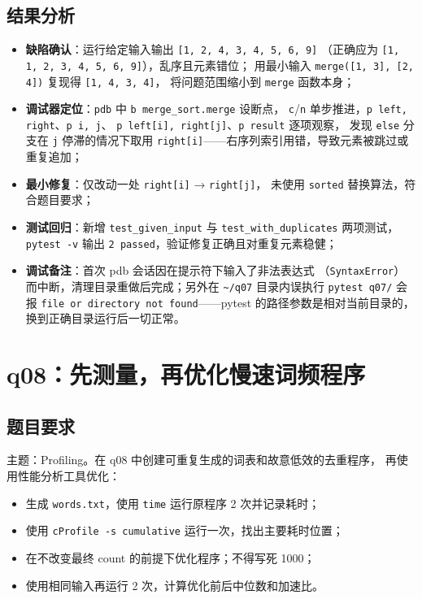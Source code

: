 \documentclass[a4paper,11pt]{ctexart}
\begin{document}
\subsection{结果分析}

\begin{itemize}
  \item \textbf{缺陷确认}：运行给定输入输出 \texttt{[1, 2, 4, 3, 4, 5, 6, 9]}
        （正确应为 \texttt{[1, 1, 2, 3, 4, 5, 6, 9]}），乱序且元素错位；
        用最小输入 \texttt{merge([1, 3], [2, 4])} 复现得 \texttt{[1, 4, 3, 4]}，
        将问题范围缩小到 \texttt{merge} 函数本身；
  \item \textbf{调试器定位}：\texttt{pdb} 中 \texttt{b merge\_sort.merge} 设断点，
        \texttt{c}/\texttt{n} 单步推进，\texttt{p left, right}、\texttt{p i, j}、
        \texttt{p left[i], right[j]}、\texttt{p result} 逐项观察，
        发现 \texttt{else} 分支在 \texttt{j} 停滞的情况下取用
        \texttt{right[i]}——右序列索引用错，导致元素被跳过或重复追加；
  \item \textbf{最小修复}：仅改动一处 \texttt{right[i]} → \texttt{right[j]}，
        未使用 \texttt{sorted} 替换算法，符合题目要求；
  \item \textbf{测试回归}：新增 \texttt{test\_given\_input} 与
        \texttt{test\_with\_duplicates} 两项测试，\texttt{pytest -v} 输出
        \texttt{2 passed}，验证修复正确且对重复元素稳健；
  \item \textbf{调试备注}：首次 pdb 会话因在提示符下输入了非法表达式
        （\texttt{SyntaxError}）而中断，清理目录重做后完成；另外在
        \texttt{\textasciitilde/q07} 目录内误执行 \texttt{pytest q07/} 会报
        \texttt{file or directory not found}——pytest 的路径参数是相对当前目录的，
        换到正确目录运行后一切正常。
\end{itemize}

\section{q08：先测量，再优化慢速词频程序}

\subsection{题目要求}

主题：Profiling。在 q08 中创建可重复生成的词表和故意低效的去重程序，
再使用性能分析工具优化：
\begin{itemize}
  \item 生成 \texttt{words.txt}，使用 \texttt{time} 运行原程序 2 次并记录耗时；
  \item 使用 \texttt{cProfile -s cumulative} 运行一次，找出主要耗时位置；
  \item 在不改变最终 count 的前提下优化程序；不得写死 1000；
  \item 使用相同输入再运行 2 次，计算优化前后中位数和加速比。
\end{itemize}
\end{document}
